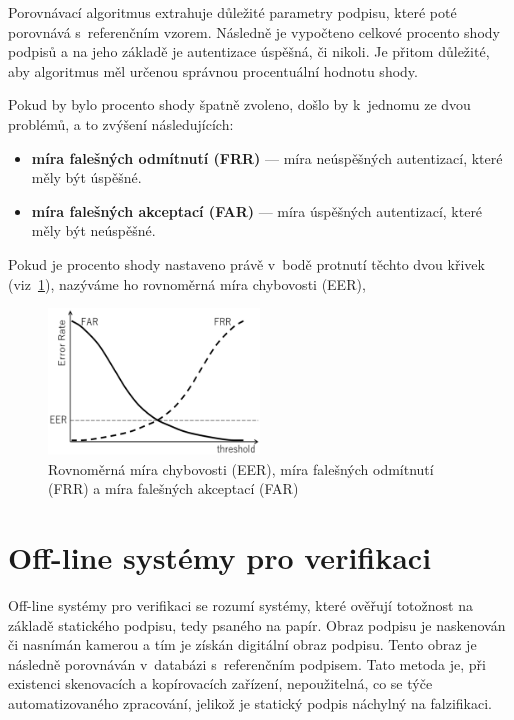 Porovnávací algoritmus extrahuje důležité parametry podpisu, které poté porovnává s~referenčním vzorem. 
Následně je vypočteno celkové procento shody podpisů a na jeho základě je autentizace úspěšná, či nikoli.
Je přitom důležité, aby algoritmus měl určenou správnou procentuální hodnotu shody. 

Pokud by bylo procento shody špatně zvoleno, došlo by k~jednomu ze dvou problémů, a to zvýšení následujících:
\begin{itemize}
  \item \textbf{míra falešných odmítnutí (FRR)} --- míra neúspěšných autentizací, které měly být úspěšné.
  \item \textbf{míra falešných akceptací (FAR)} --- míra úspěšných autentizací, které měly být neúspěšné.
\end{itemize}

Pokud je procento shody nastaveno právě v~bodě protnutí těchto dvou křivek (viz~\ref{fig:FAR_FRR}), nazýváme ho rovnoměrná míra chybovosti (EER), 

\begin{figure}[h]
  \centering
  \includegraphics[width=0.5\textwidth]{obrazky-figures/FAR_FRR.png}
  \caption{Rovnoměrná míra chybovosti (EER), míra falešných odmítnutí (FRR) a míra falešných akceptací (FAR)~\cite{cursorinsight_frr_fa}} %
  \label{fig:FAR_FRR}
\end{figure}

\newpage

\section{Off-line systémy pro verifikaci}
Off-line systémy pro verifikaci se rozumí systémy, které ověřují totožnost na základě statického podpisu, tedy psaného na papír.  %
Obraz podpisu je naskenován či nasnímán kamerou a tím je získán digitální obraz podpisu.                                          %
Tento obraz je následně porovnáván v~databázi s~referenčním podpisem.                                                             %
Tato metoda je, při existenci skenovacích a kopírovacích zařízení, nepoužitelná, co se týče automatizovaného zpracování, jelikož je statický podpis náchylný na falzifikaci.~\cite{RakRoman2008}%


